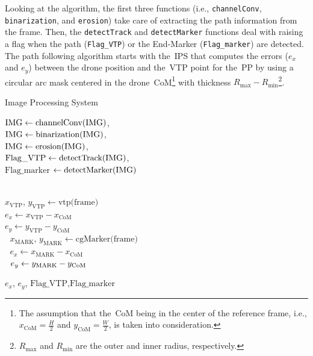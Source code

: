 Looking at the algorithm, the first three functions (i.e., \texttt{channelConv}, \texttt{binarization}, and \texttt{erosion}) take care of extracting the path information from the frame. Then, the \texttt{detectTrack} and \texttt{detectMarker} functions deal with raising a flag when the path (\texttt{Flag\_VTP}) or the End-Marker (\texttt{Flag\_marker}) are detected. The path following algorithm starts with the~\gls{IPS} that computes the errors ($e_x$ and $e_y$) between the drone position and the~\gls{VTP} point for the~\gls{PP} by using a circular arc mask centered in the drone~\gls{CoM}\footnote{The assumption that the~\gls{CoM} being in the center of the reference frame, i.e., $x_\mathrm{CoM} = \frac{H}{2}$ and $y_\mathrm{CoM}=\frac{W}{2}$, is taken into consideration.} with thickness $R_\mathrm{max} - R_\mathrm{min}$\footnote{$R_\mathrm{max}$ and $R_\mathrm{min}$ are the outer and inner radius, respectively.}. 
%
\def\BState{\State\hskip-\ALG@thistlm}
%
\begin{algorithm}
	\caption{Image Processing System}\label{alg:imageProcessing}
	\begin{algorithmic}[1]
		\State $\text{IMG}  \gets \text{channelConv(\text{IMG})}$, \\
		$\text{IMG} \gets \text{binarization(\text{IMG})}$, \\
		$\text{IMG} \gets \text{erosion(\text{IMG})}$, \\
		$\text{Flag\_VTP} \gets \text{detectTrack(\text{IMG})}$, \\
		$\text{Flag\_marker}$ $\gets \text{detectMarker(\text{IMG})}$
		
		 \\ 
		\quad $x_\mathrm{VTP}$, $y_\mathrm{VTP} \gets \text{vtp(frame)}$ \\
		\quad $e_x \gets x_\mathrm{VTP} - x_\mathrm{CoM}$ \\
		\quad $e_y \gets y_\mathrm{VTP} - y_\mathrm{CoM}$
		\Else {} \\
		\quad \quad $\;$ $x_\mathrm{MARK}$, $y_\mathrm{MARK} \gets \text{cgMarker(frame)}$ \\
		\quad \quad $\;$ $e_x \gets x_\mathrm{MARK} - x_\mathrm{CoM}$ \\ 
		\quad \quad $\;$ $e_y \gets y_{\rm MARK} - y_{\rm CoM}$
		\EndIf \EndIf
		
		\State \Return $e_x$, $e_y$, $\text{Flag\_VTP}, \text{Flag\_marker}$ 
	\end{algorithmic}
\end{algorithm}


